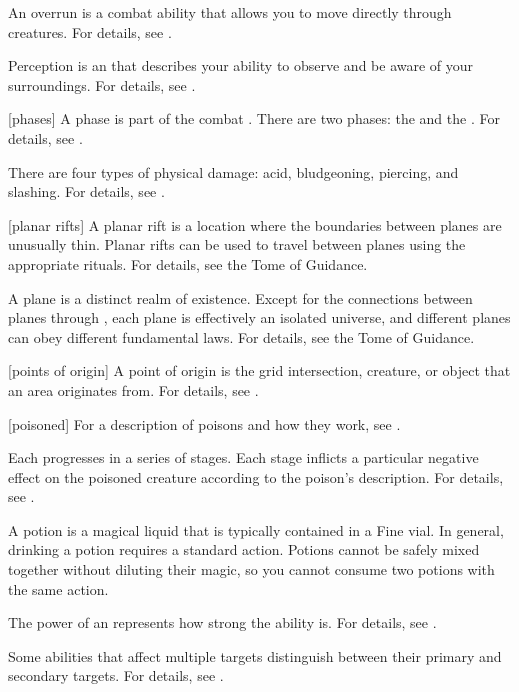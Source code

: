  An overrun is a combat ability that allows you to move directly through creatures.
For details, see .

 Perception is an  that describes your ability to observe and be aware of your surroundings.
For details, see .

[phases] A phase is part of the combat .
There are two phases: the  and the .
For details, see .

 There are four types of physical damage: acid, bludgeoning, piercing, and slashing.
For details, see .

[planar rifts] A planar rift is a location where the boundaries between planes are unusually thin.
Planar rifts can be used to travel between planes using the appropriate rituals.
For details, see the Tome of Guidance.

 A plane is a distinct realm of existence.
Except for the connections between planes through , each plane is effectively an isolated universe, and different planes can obey different fundamental laws.
For details, see the Tome of Guidance.

[points of origin] A point of origin is the grid intersection, creature, or object that an area originates from.
For details, see .

[poisoned] For a description of poisons and how they work, see .

 Each  progresses in a series of stages.
Each stage inflicts a particular negative effect on the poisoned creature according to the poison's description.
For details, see .

 A potion is a magical liquid that is typically contained in a Fine vial.
In general, drinking a potion requires a standard action.
Potions cannot be safely mixed together without diluting their magic, so you cannot consume two potions with the same action.

 The power of an  represents how strong the ability is.
For details, see .

 Some abilities that affect multiple targets distinguish between their primary and secondary targets.
For details, see .

